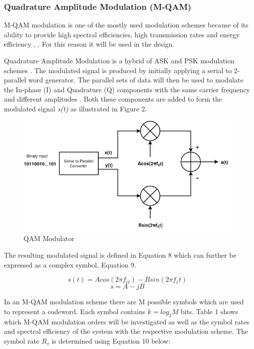 \documentclass[pdftex,11pt,a4paper]{article}
\begin{document}
\subsubsection{Quadrature Amplitude Modulation (M-QAM)}
M-QAM modulation is one of the mostly used modulation schemes because of its ability to provide high spectral efficiencies, high transmission rates and energy efficiency \cite{65_10}, \cite{65_11}. For this reason it will be used in the design.

Quadrature Amplitude Modulation is a hybrid of ASK and PSK modulation schemes \cite{unknownBook}. The modulated signal is produced by initially applying a serial to 2-parallel word generator. The parallel sets of data will then be used to modulate the In-phase (I) and Quadrature (Q) components with the same carrier frequency and different amplitudes \cite{65}. Both these components are added to form the modulated signal \textit{s(t)} as illustrated in Figure 2.

\begin{figure}[h!]
	\centering
	\includegraphics[scale=0.53]{QAM.png}
	\caption{QAM Modulator}
	\label{fig:1}
\end{figure}{}

The resulting modulated signal is defined in Equation 8 which can further be expressed as a complex symbol, Equation 9.

\begin{equation}
	s(t) = Acos(2\pi f_{ct}) - Bsin(2\pi f_{c}t)
\end{equation}
\begin{equation}
s = A - jB
\end{equation}

In an M-QAM modulation scheme there are M possible symbols which are used to represent a codeword. Each symbol contains \(k = log_{2}M\) bits. Table 1 shows which M-QAM modulation orders will be investigated as well as the symbol rates and spectral efficiency of the system with the respective modulation scheme. The symbol rate \(R_s\) is determined using Equation 10 below:
\end{document}
